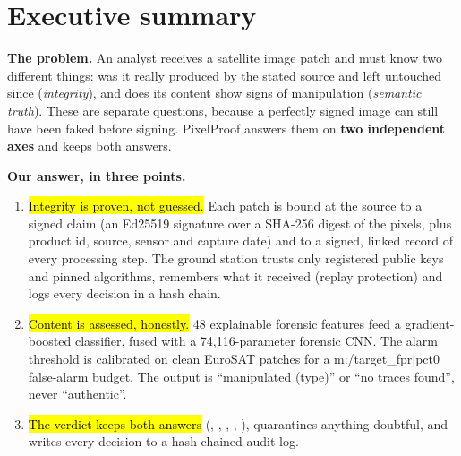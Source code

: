 \section{Executive summary}\label{sec:summary}
\begin{keybox}
\textbf{The problem.} An analyst receives a satellite image patch and must know two different things: was it really produced by the stated source and left untouched since (\emph{integrity}), and does its content show signs of manipulation (\emph{semantic truth}). These are separate questions, because a perfectly signed image can still have been faked before signing. PixelProof answers them on \textbf{two independent axes} and keeps both answers.
\end{keybox}

\textbf{Our answer, in three points.}
\begin{enumerate}
  \item \hl{Integrity is proven, not guessed.} Each patch is bound at the source to a signed claim (an Ed25519 signature over a SHA-256 digest of the pixels, plus product id, source, sensor and capture date) and to a signed, linked record of every processing step. The ground station trusts only registered public keys and pinned algorithms, remembers what it received (replay protection) and logs every decision in a hash chain.
  \item \hl{Content is assessed, honestly.} 48 explainable forensic features feed a gradient-boosted classifier, fused with a 74,116-parameter forensic CNN. The alarm threshold is calibrated on clean EuroSAT patches for a {{m:/target_fpr|pct0}} \targ{} false-alarm budget. The output is ``manipulated (type)'' or ``no traces found'', never ``authentic''.
  \item \hl{The verdict keeps both answers} (, , , , ), quarantines anything doubtful, and writes every decision to a hash-chained audit log.
\end{enumerate}


